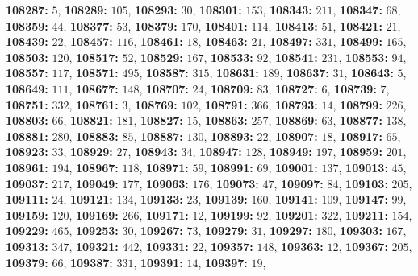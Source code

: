 \textsf{\bfseries 108287:} $5$, \textsf{\bfseries 108289:} $105$, \textsf{\bfseries 108293:} $30$, \textsf{\bfseries 108301:} $153$, \textsf{\bfseries 108343:} $211$, \textsf{\bfseries 108347:} $68$, \textsf{\bfseries 108359:} $44$, \textsf{\bfseries 108377:} $53$, \textsf{\bfseries 108379:} $170$, \textsf{\bfseries 108401:} $114$, \textsf{\bfseries 108413:} $51$, \textsf{\bfseries 108421:} $21$, \textsf{\bfseries 108439:} $22$, \textsf{\bfseries 108457:} $116$, \textsf{\bfseries 108461:} $18$, \textsf{\bfseries 108463:} $21$, \textsf{\bfseries 108497:} $331$, \textsf{\bfseries 108499:} $165$, \textsf{\bfseries 108503:} $120$, \textsf{\bfseries 108517:} $52$, \textsf{\bfseries 108529:} $167$, \textsf{\bfseries 108533:} $92$, \textsf{\bfseries 108541:} $231$, \textsf{\bfseries 108553:} $94$, \textsf{\bfseries 108557:} $117$, \textsf{\bfseries 108571:} $495$, \textsf{\bfseries 108587:} $315$, \textsf{\bfseries 108631:} $189$, \textsf{\bfseries 108637:} $31$, \textsf{\bfseries 108643:} $5$, \textsf{\bfseries 108649:} $111$, \textsf{\bfseries 108677:} $148$, \textsf{\bfseries 108707:} $24$, \textsf{\bfseries 108709:} $83$, \textsf{\bfseries 108727:} $6$, \textsf{\bfseries 108739:} $7$, \textsf{\bfseries 108751:} $332$, \textsf{\bfseries 108761:} $3$, \textsf{\bfseries 108769:} $102$, \textsf{\bfseries 108791:} $366$, \textsf{\bfseries 108793:} $14$, \textsf{\bfseries 108799:} $226$, \textsf{\bfseries 108803:} $66$, \textsf{\bfseries 108821:} $181$, \textsf{\bfseries 108827:} $15$, \textsf{\bfseries 108863:} $257$, \textsf{\bfseries 108869:} $63$, \textsf{\bfseries 108877:} $138$, \textsf{\bfseries 108881:} $280$, \textsf{\bfseries 108883:} $85$, \textsf{\bfseries 108887:} $130$, \textsf{\bfseries 108893:} $22$, \textsf{\bfseries 108907:} $18$, \textsf{\bfseries 108917:} $65$, \textsf{\bfseries 108923:} $33$, \textsf{\bfseries 108929:} $27$, \textsf{\bfseries 108943:} $34$, \textsf{\bfseries 108947:} $128$, \textsf{\bfseries 108949:} $197$, \textsf{\bfseries 108959:} $201$, \textsf{\bfseries 108961:} $194$, \textsf{\bfseries 108967:} $118$, \textsf{\bfseries 108971:} $59$, \textsf{\bfseries 108991:} $69$, \textsf{\bfseries 109001:} $137$, \textsf{\bfseries 109013:} $45$, \textsf{\bfseries 109037:} $217$, \textsf{\bfseries 109049:} $177$, \textsf{\bfseries 109063:} $176$, \textsf{\bfseries 109073:} $47$, \textsf{\bfseries 109097:} $84$, \textsf{\bfseries 109103:} $205$, \textsf{\bfseries 109111:} $24$, \textsf{\bfseries 109121:} $134$, \textsf{\bfseries 109133:} $23$, \textsf{\bfseries 109139:} $160$, \textsf{\bfseries 109141:} $109$, \textsf{\bfseries 109147:} $99$, \textsf{\bfseries 109159:} $120$, \textsf{\bfseries 109169:} $266$, \textsf{\bfseries 109171:} $12$, \textsf{\bfseries 109199:} $92$, \textsf{\bfseries 109201:} $322$, \textsf{\bfseries 109211:} $154$, \textsf{\bfseries 109229:} $465$, \textsf{\bfseries 109253:} $30$, \textsf{\bfseries 109267:} $73$, \textsf{\bfseries 109279:} $31$, \textsf{\bfseries 109297:} $180$, \textsf{\bfseries 109303:} $167$, \textsf{\bfseries 109313:} $347$, \textsf{\bfseries 109321:} $442$, \textsf{\bfseries 109331:} $22$, \textsf{\bfseries 109357:} $148$, \textsf{\bfseries 109363:} $12$, \textsf{\bfseries 109367:} $205$, \textsf{\bfseries 109379:} $66$, \textsf{\bfseries 109387:} $331$, \textsf{\bfseries 109391:} $14$, \textsf{\bfseries 109397:} $19$, 
